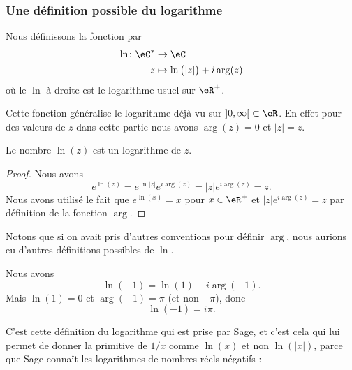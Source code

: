 \subsubsection{Une définition possible du logarithme}

\begin{definition}      \label{DEFooWDYNooYIXVMC}
    Nous définissons la fonction  par
    \begin{equation}
        \begin{aligned}
            \ln\colon \eC^*&\to \eC \\
            z&\mapsto \ln\big( | z | \big)+i\arg(z)
        \end{aligned}
    \end{equation}
    où le \( \ln\) à droite est le logarithme usuel sur \( \eR^+\).
\end{definition}

\begin{remark}
Cette fonction généralise le logarithme déjà vu sur \( \mathopen] 0 , \infty \mathclose[\subset \eR\). En effet pour des valeurs de \( z\) dans cette partie nous avons \( \arg(z)=0\) et \( | z |=z\).
\end{remark}

\begin{lemma}
    Le nombre \( \ln(z)\) est un logarithme de \( z\).
\end{lemma}

\begin{proof}
    Nous avons
    \begin{equation}
        e^{\ln(z)}= e^{\ln| z |} e^{i\arg(z)}=| z | e^{i\arg(z)}=z.
    \end{equation}
    Nous avons utilisé le fait que \(  e^{\ln(x)}=x\) pour \( x\in\eR^+\) et \( | z | e^{i\arg(z)}=z\) par définition de la fonction \( \arg\).
\end{proof}

Notons que si on avait pris d'autres conventions pour définir \( \arg\), nous aurions eu d'autres définitions possibles de \( \ln\).

\begin{example}
    Nous avons
    \begin{equation}
        \ln(-1)=\ln(1)+i\arg(-1).
    \end{equation}
    Mais \( \ln(1)=0\) et \( \arg(-1)=\pi\) (et non \( -\pi\)), donc
    \begin{equation}
        \ln(-1)=i\pi.
    \end{equation}

    C'est cette définition du logarithme qui est prise par Sage, et c'est cela qui lui permet de donner la primitive de \( 1/x\) comme \( \ln(x)\) et non \( \ln(| x |)\), parce que Sage connaît les logarithmes de nombres réels négatifs :

\end{example}

